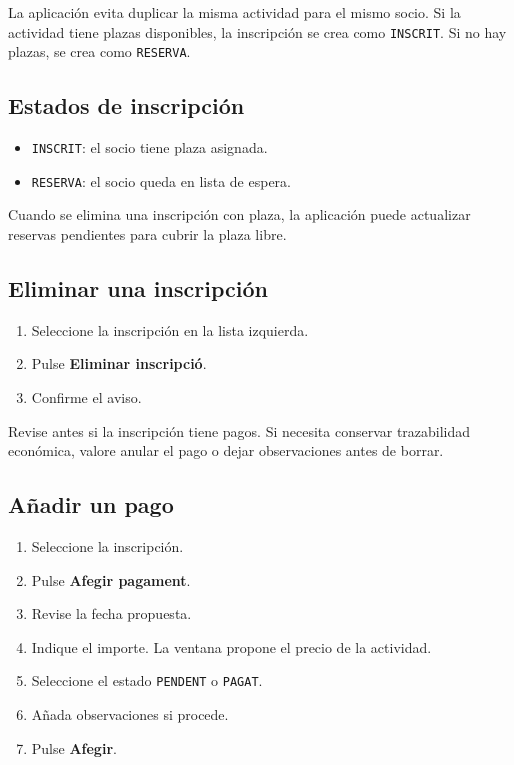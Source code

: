 \documentclass[12pt]{article}
\newcommand{\boton}[1]{\textbf{#1}}
\newcommand{\estado}[1]{\texttt{#1}}
\begin{document}
La aplicación evita duplicar la misma actividad para el mismo socio. Si la actividad tiene plazas disponibles, la inscripción se crea como \estado{INSCRIT}. Si no hay plazas, se crea como \estado{RESERVA}.

\subsection{Estados de inscripción}
\begin{itemize}
  \item \estado{INSCRIT}: el socio tiene plaza asignada.
  \item \estado{RESERVA}: el socio queda en lista de espera.
\end{itemize}

Cuando se elimina una inscripción con plaza, la aplicación puede actualizar reservas pendientes para cubrir la plaza libre.

\subsection{Eliminar una inscripción}
\begin{enumerate}
  \item Seleccione la inscripción en la lista izquierda.
  \item Pulse \boton{Eliminar inscripció}.
  \item Confirme el aviso.
\end{enumerate}

Revise antes si la inscripción tiene pagos. Si necesita conservar trazabilidad económica, valore anular el pago o dejar observaciones antes de borrar.

\subsection{Añadir un pago}
\begin{enumerate}
  \item Seleccione la inscripción.
  \item Pulse \boton{Afegir pagament}.
  \item Revise la fecha propuesta.
  \item Indique el importe. La ventana propone el precio de la actividad.
  \item Seleccione el estado \estado{PENDENT} o \estado{PAGAT}.
  \item Añada observaciones si procede.
  \item Pulse \boton{Afegir}.
\end{enumerate}
\end{document}
